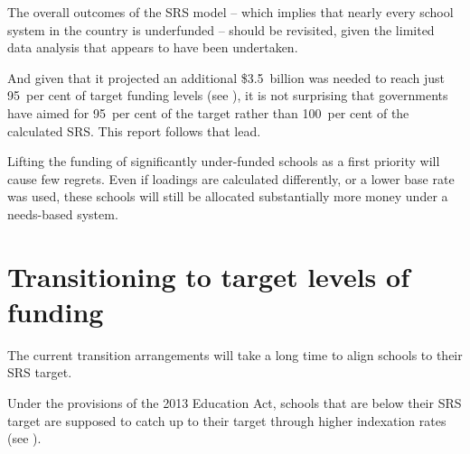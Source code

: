 \documentclass{grattan}
\begin{document}
The overall outcomes of the SRS model -- which implies that nearly every school system in the country is underfunded -- should be revisited, given the limited data analysis that appears to have been undertaken.

And given that it projected an additional \$3.5~billion was needed to reach just 95~per cent of target funding levels (see ), it is not surprising that governments have aimed for 95~per cent of the target rather than 100~per cent of the calculated SRS\@. This report follows that lead.

Lifting the funding of significantly under-funded schools as a first priority will cause few regrets.
Even if loadings are calculated differently, or a lower base rate was used, these schools will still be allocated substantially more money under a needs-based system.

\pagebreak[3]
\section{Transitioning to target levels of funding}\label{sec:The-current-transition-arrangements-will-take-a-long-time}

The current transition arrangements will take a long time to align schools to their SRS target.

Under the provisions of the 2013 Education Act, schools that are below their SRS target are supposed to catch up to their target through higher indexation rates (see ).
\end{document}
